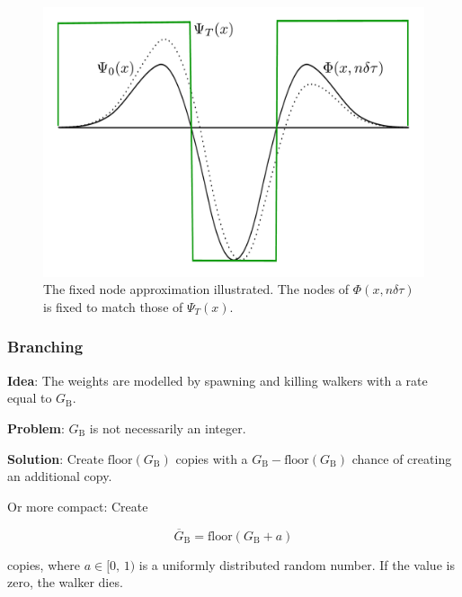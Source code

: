\begin{frame}
\begin{figure}
 \begin{center}
  \includegraphics[scale=0.3]{../graphics/fixxednode.pdf}
 \end{center}
 \caption{The fixed node approximation illustrated. The nodes of $\Phi(x, n\delta\tau)$ is fixed to match those of $\Psi_T(x)$.}
\end{figure}
\end{frame}


\begin{frame}
\frametitle{Branching}

\textbf{Idea}: The weights are modelled by spawning and killing walkers with a rate equal to $G_\mathrm{B}$. 
\shift

\textbf{Problem}: $G_\mathrm{B}$ is not necessarily an integer.
\shift

\textbf{Solution}: Create $\mathrm{floor}(G_\mathrm{B})$ copies with a $G_\mathrm{B} - \mathrm{floor}(G_\mathrm{B})$ chance of creating an additional copy.
\shift

Or more compact: Create 

\begin{equation}
\overline{G}_\mathrm{B} = \mathrm{floor}(G_\mathrm{B} + a)
\end{equation}

copies, where $a \in [0,\,1)$ is a uniformly distributed random number. If the value is zero, the walker dies.

\end{frame}


